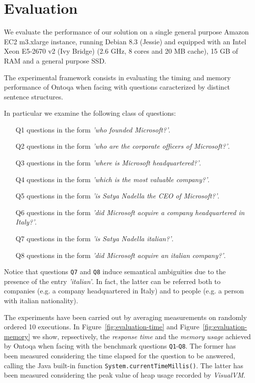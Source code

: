 \section{Evaluation}
\label{sec:evaluation}
We evaluate the performance of our solution on a single general purpose
Amazon EC2 m3.xlarge instance, running Debian 8.3 (Jessie)
and equipped with an Intel Xeon E5-2670 v2 (Ivy Bridge)  (2.6 GHz,
8 cores and 20 MB cache), 15 GB of RAM and a general purpose SSD.

The experimental framework consists in evaluating the timing and memory performance of Ontoqa when facing with questions caracterized by distinct sentence structures.

In particular we examine the following class of questions:

\begin{itemize}
	\item[Q1] questions in the form \textit{'who founded Microsoft?'}.
	\item[Q2] questions in the form \textit{'who are the corporate officers of Microsoft?'}.
	\item[Q3] questions in the form \textit{'where is Microsoft headquartered?'}.
	\item[Q4] questions in the form \textit{'which is the most valuable company?'}.
	\item[Q5] questions in the form \textit{'is Satya Nadella the CEO of Microsoft?'}.
	\item[Q6] questions in the form \textit{'did Microsoft acquire a company headquartered in Italy?'}.
	\item[Q7] questions in the form \textit{'is Satya Nadella italian?'}.
	\item[Q8] questions in the form \textit{'did Microsoft acquire an italian company?'}.
\end{itemize}

Notice that questions \texttt{Q7} and \texttt{Q8} induce semantical ambiguities due to the presence of the entry \textit{'italian'}. In fact, the latter can be referred both to companies (e.g. a company headquartered in Italy) and to people (e.g. a person with italian nationality).

The experiments have been carried out by averaging measurements on randomly ordered 10 executions.
%
In Figure~\ref{fig:evaluation-time} and Figure~\ref{fig:evaluation-memory} we show, repsectively, the \textit{response time} and the \textit{memory usage} achieved by Ontoqa when facing with the benchmark questions \texttt{Q1}-\texttt{Q8}.
%
The former has been measured considering the time elapsed for the question to be answered, calling the Java built-in function \texttt{System.currentTimeMillis()}.
%
The latter has been measured considering the peak value of heap usage recorded by \textit{VisualVM}.

